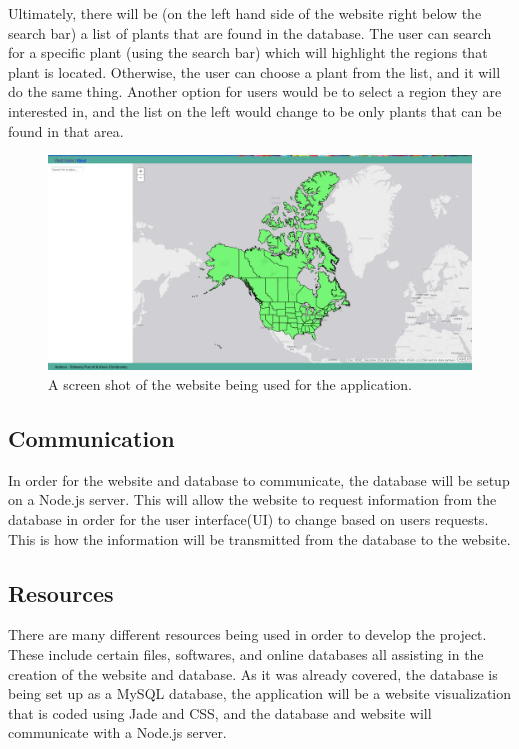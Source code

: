 \documentclass{Group6_Phase1}
\begin{document}
Ultimately, there will be (on the left hand side of the website right below the search bar) a list of plants that are found in the database. The user can search for a specific plant (using the search bar) which will highlight the regions that plant is located. Otherwise, the user can choose a plant from the list, and it will do the same thing. Another option for users would be to select a region they are interested in, and the list on the left would change to be only plants that can be found in that area. 

\begin{figure}[htb]
	\centering
	\includegraphics[scale=0.17]{Website_Screenshot.png}
	\caption{A screen shot of the website being used for the application.}
\end{figure}
\subsection{Communication}
In order for the website and database to communicate, the database will be setup on a Node.js server. This will allow the website to request information from the database in order for the user interface(UI) to change based on users requests. This is how the information will be transmitted from the database to the website. 

\subsection{Resources}
There are many different resources being used in order to develop the project. These include certain files, softwares, and online databases all assisting in the creation of the website and database. As it was already covered, the database is being set up as a MySQL database, the application will be a website visualization that is coded using Jade and CSS, and the database and website will communicate with a Node.js server. 
\end{document}
